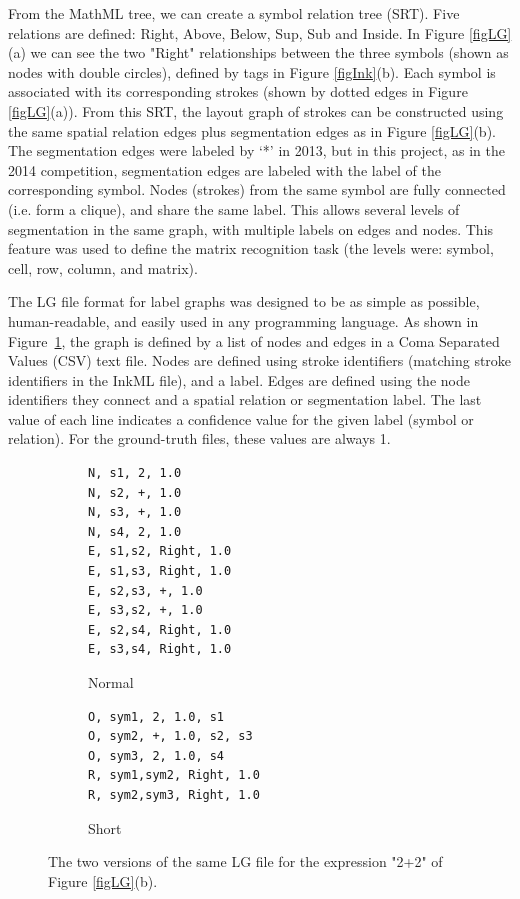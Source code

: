 \documentclass{article}
\begin{document}
From the MathML tree, we can create a symbol relation tree (SRT). Five relations are defined: Right, Above, Below, Sup, Sub and Inside. In Figure \ref{figLG}(a) we can see the two "Right" relationships between the three symbols (shown as nodes with double circles), defined by  tags in Figure \ref{figInk}(b). Each symbol is associated with its corresponding strokes (shown by dotted edges in Figure \ref{figLG}(a)). From this SRT, the layout graph of strokes can be constructed using the same spatial relation edges plus segmentation edges as in Figure \ref{figLG}(b). The segmentation edges were labeled by ‘*’ in 2013, but in this project, as in the 2014 competition, segmentation edges are labeled with the label of the corresponding symbol.
Nodes (strokes) from the same symbol are fully connected (i.e. form a clique), and share the same label. This allows several levels of segmentation in the same graph, with multiple labels on edges and nodes. This feature was used to define the matrix recognition task (the levels were: symbol, cell, row, column, and matrix).

The LG file format for label graphs was designed to be as simple as possible, human-readable, and easily used in any programming language. As shown in Figure~\ref{figLGF}, the graph is defined by a list of nodes and edges in a Coma Separated Values (CSV) text file. Nodes are defined using stroke identifiers (matching stroke identifiers in the InkML file), and a label. Edges are defined using the node identifiers they connect and a spatial relation or segmentation label. The last value of each line indicates a confidence value for the given label (symbol or relation). For the ground-truth files, these values are always 1.

\begin{figure}
\begin{subfigure}{0.5\linewidth}
\begin{verbatim}
N, s1, 2, 1.0
N, s2, +, 1.0
N, s3, +, 1.0
N, s4, 2, 1.0
E, s1,s2, Right, 1.0
E, s1,s3, Right, 1.0
E, s2,s3, +, 1.0
E, s3,s2, +, 1.0
E, s2,s4, Right, 1.0
E, s3,s4, Right, 1.0
\end{verbatim} 
\caption{Normal}
\end{subfigure}
\begin{subfigure}{0.5\linewidth}
\begin{verbatim}
O, sym1, 2, 1.0, s1
O, sym2, +, 1.0, s2, s3
O, sym3, 2, 1.0, s4
R, sym1,sym2, Right, 1.0
R, sym2,sym3, Right, 1.0
\end{verbatim}
\caption{Short}
\end{subfigure}
\caption{The two versions of the same LG file for the expression "2+2" of Figure \ref{figLG}(b).
\label{figLGF}}
\end{figure}
\end{document}
